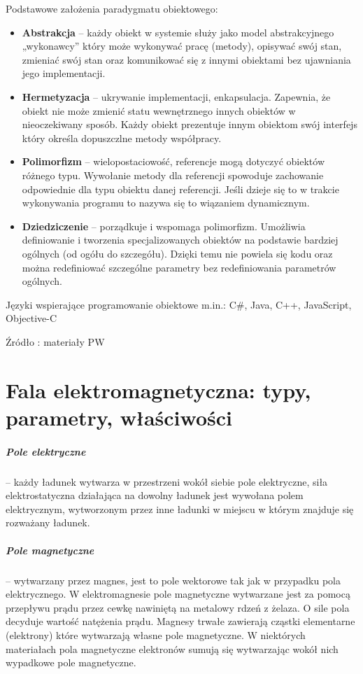 \documentclass[a4paper,twoside]{report}
\begin{document}
Podstawowe założenia paradygmatu obiektowego:
\begin{itemize}
\item \textbf{Abstrakcja} – każdy obiekt w systemie służy jako model abstrakcyjnego „wykonawcy” który może wykonywać pracę (metody), opisywać swój stan, zmieniać swój stan oraz komunikować się z innymi obiektami bez ujawniania jego implementacji.
\item \textbf{Hermetyzacja} – ukrywanie implementacji, enkapsulacja. Zapewnia, że obiekt nie może zmienić statu wewnętrznego innych obiektów w nieoczekiwany sposób. Każdy obiekt prezentuje innym obiektom swój interfejs który określa dopuszczlne metody współpracy.
\item \textbf{Polimorfizm} – wielopostaciowość, referencje mogą dotyczyć obiektów różnego typu. Wywołanie metody dla referencji spowoduje zachowanie odpowiednie dla typu obiektu danej referencji. Jeśli dzieje się to w trakcie wykonywania programu to nazywa się to wiązaniem dynamicznym.
\item \textbf{Dziedziczenie} – porządkuje i wspomaga polimorfizm. Umożliwia definiowanie i tworzenia specjalizowanych obiektów na podstawie bardziej ogólnych (od ogółu do szczegółu). Dzięki temu nie powiela się kodu oraz można redefiniować szczególne parametry bez redefiniowania parametrów ogólnych.
\end{itemize}
\medskip 

Języki wspierające programowanie obiektowe m.in.: C\#, Java, C++, JavaScript, Objective-C
\medskip 

Źródło : materiały PW


\chapter{Fala elektromagnetyczna: typy, parametry, właściwości}
\paragraph{Pole elektryczne} – każdy ładunek wytwarza w przestrzeni wokół siebie pole elektryczne, siła elektrostatyczna działająca na dowolny ładunek jest wywołana polem elektrycznym, wytworzonym przez inne ładunki w miejscu w którym znajduje się rozważany ładunek.

\paragraph{Pole magnetyczne} – wytwarzany przez magnes, jest to pole wektorowe tak jak w przypadku pola elektrycznego. W elektromagnesie pole magnetyczne wytwarzane jest za pomocą przepływu prądu przez cewkę nawiniętą na metalowy rdzeń z żelaza. O sile pola decyduje wartość natężenia prądu. Magnesy trwałe zawierają cząstki elementarne (elektrony) które wytwarzają własne pole magnetyczne. W niektórych materiałach pola magnetyczne elektronów sumują się wytwarzając wokół nich wypadkowe pole magnetyczne.
\end{document}
